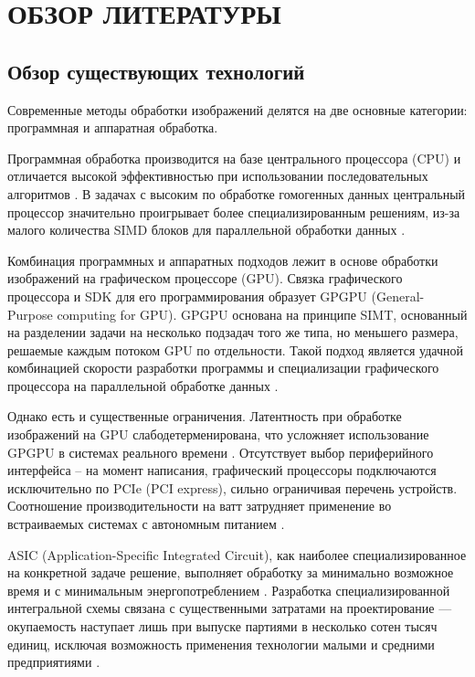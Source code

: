 \section{ОБЗОР ЛИТЕРАТУРЫ}
\label{sec:domain}

\subsection{Обзор существующих технологий}
\label{sub:domain:technologies_review}

Современные методы обработки изображений делятся на две основные категории: программная и аппаратная обработка.

Программная обработка производится на базе центрального процессора (CPU) и отличается высокой эффективностью
при использовании последовательных алгоритмов \cite{asano_dip_comp}. В задачах с высоким  по обработке гомогенных данных
центральный процессор значительно проигрывает более специализированным решениям,
из-за малого количества SIMD блоков для параллельной обработки данных \cite{axell_cpu_simd}.

Комбинация программных и аппаратных подходов лежит в основе обработки изображений на графическом процессоре (GPU).
Связка графического процессора и SDK для его программирования образует GPGPU (General-Purpose computing for GPU).
GPGPU основана на принципе SIMT, основанный на разделении задачи на несколько подзадач того же типа, но меньшего размера,
решаемые каждым потоком GPU по отдельности.
Такой подход является удачной комбинацией скорости разработки программы и специализации графического процессора
на параллельной обработке данных \cite{patterson_hennessy}.

Однако есть и существенные ограничения.
Латентность при обработке изображений на GPU слабодетерменирована, что усложняет использование GPGPU
в системах реального времени \cite{maceina_gpu_real_time}.
Отсутствует выбор периферийного интерфейса -- на момент написания,
графический процессоры подключаются исключительно по PCIe (PCI express), сильно ограничивая перечень устройств.
Соотношение производительности на ватт затрудняет применение во встраиваемых системах с автономным питанием \cite{fowers_gpu_power_consumption}.

ASIC (Application-Specific Integrated Circuit), как наиболее специализированное на конкретной задаче решение, выполняет обработку за минимально возможное время
и с минимальным энергопотреблением \cite{amara_asic_low_power}. Разработка специализированной интегральной схемы связана
с существенными затратами на проектирование --- окупаемость наступает лишь при выпуске партиями в несколько сотен тысяч единиц,
исключая возможность применения технологии малыми и средними предприятиями \cite{smith_asic_economy}.

